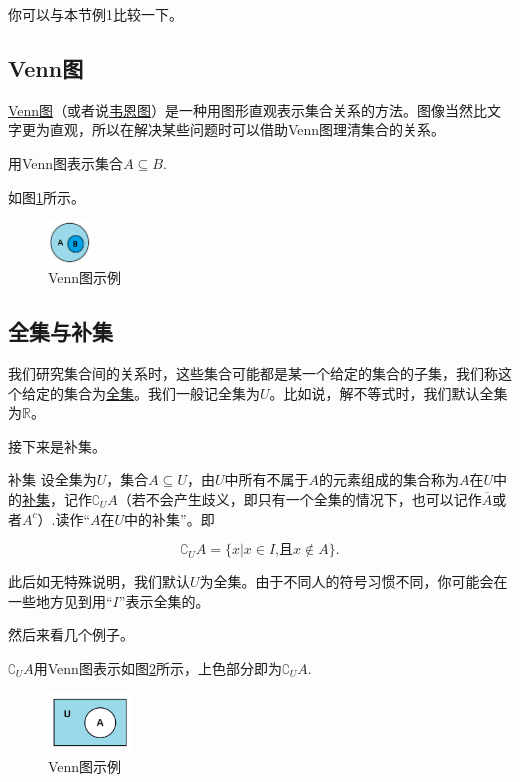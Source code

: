 \documentclass[lang=cn,math=cm,chinesefont=nofont,11pt,scheme=chinese,onecol]{elegantbook}
\begin{document}
\begin{remark}
  你可以与本节例1比较一下。
\end{remark}

\subsection{Venn图}
  \underline{Venn图}（或者说\underline{韦恩图}）是一种用图形直观表示集合关系的方法。图像当然比文字更为直观，所以在解决某些问题时可以借助Venn图理清集合的关系。

\begin{example}
  用Venn图表示集合$A\subseteq B$.
\end{example}
\begin{solution}
  如图\ref{img:Venn1}所示。
\end{solution}
\begin{figure}[h]
  \centering
  \includegraphics[width=0.1\textwidth]{image/Venn1.png}
  \caption{Venn图示例}
  \label{img:Venn1}
\end{figure}

\subsection{全集与补集}
  我们研究集合间的关系时，这些集合可能都是某一个给定的集合的子集，我们称这个给定的集合为\underline{全集}。我们一般记全集为$U$。比如说，解不等式时，我们默认全集为$\mathbb{R}$。

  接下来是补集。
\begin{definition}{补集}
  设全集为$U$，集合$A\subseteq U$，由$U$中所有不属于$A$的元素组成的集合称为$A$在$U$中的\underline{补集}，记作${\complement}_{U}A$（若不会产生歧义，即只有一个全集的情况下，也可以记作$\overline{A}$或者$A^c$）.读作“$A$在$U$中的补集”。即

  $${\complement}_{U}A=\{x|x\in I\text{,且}x\notin A\}.$$
\end{definition}
\begin{remark}
  此后如无特殊说明，我们默认$U$为全集。由于不同人的符号习惯不同，你可能会在一些地方见到用“$I$”表示全集的。
\end{remark}
  然后来看几个例子。
\begin{example}
  $\complement_{U}A$用Venn图表示如图\ref{img:Venn3}所示，上色部分即为$\complement_{U}A$.
\end{example}
\begin{figure}[h]
  \centering
  \includegraphics[width=0.2\textwidth]{image/Venn3.png}
  \caption{Venn图示例}
  \label{img:Venn3}
\end{figure}
\end{document}
